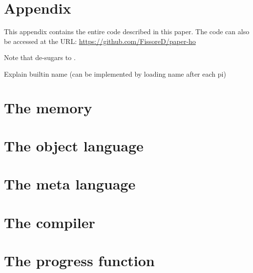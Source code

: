\section*{Appendix}

This appendix contains the entire code described in this paper.
The code can also be accessed at the URL: \url{https://github.com/FissoreD/paper-ho}

Note that  de-sugars to .

Explain builtin name (can be implemented by loading name after each pi)

\section{The memory}



\section{The object language}



\section{The meta language}



\section{The compiler}



\section{The progress function}

